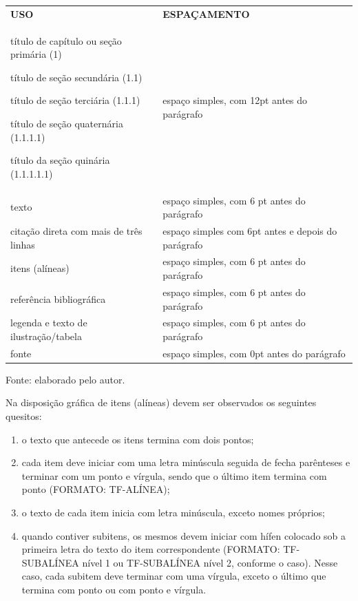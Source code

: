 \begin{longtable}[]{@{}
  >{\raggedright\arraybackslash}p{}
  >{\raggedright\arraybackslash}p{}@{}}
\toprule\noalign{}
\endhead
\bottomrule\noalign{}
\endlastfoot
\textbf{USO} & \textbf{ESPAÇAMENTO} \\
título de capítulo ou seção primária (1)

título de seção secundária (1.1)

título de seção terciária (1.1.1)

título de seção quaternária (1.1.1.1)

título da seção quinária (1.1.1.1.1) & espaço simples, com 12pt antes do
parágrafo \\
texto & espaço simples, com 6 pt antes do parágrafo \\
citação direta com mais de três linhas & espaço simples com 6pt antes e
depois do parágrafo \\
itens (alíneas) & espaço simples, com 6 pt antes do parágrafo \\
referência bibliográfica & espaço simples, com 6 pt antes do
parágrafo \\
legenda e texto de ilustração/tabela & espaço simples, com 6 pt antes do
parágrafo \\
fonte & espaço simples, com 0pt antes do parágrafo \\
\end{longtable}

Fonte: elaborado pelo autor.

Na disposição gráfica de itens (alíneas) devem ser observados os
seguintes quesitos:

\begin{enumerate}
\def\labelenumi{\alph{enumi})}
\item
  o texto que antecede os itens termina com dois pontos;
\item
  cada item deve iniciar com uma letra minúscula seguida de fecha
  parênteses e terminar com um ponto e vírgula, sendo que o último item
  termina com ponto (FORMATO: TF-ALÍNEA);
\item
  o texto de cada item inicia com letra minúscula, exceto nomes
  próprios;
\item
  quando contiver subitens, os mesmos devem iniciar com hífen colocado
  sob a primeira letra do texto do item correspondente (FORMATO:
  TF-SUBALÍNEA nível 1 ou TF-SUBALÍNEA nível 2, conforme o caso). Nesse
  caso, cada subitem deve terminar com uma vírgula, exceto o último que
  termina com ponto ou com ponto e vírgula.
\end{enumerate}

